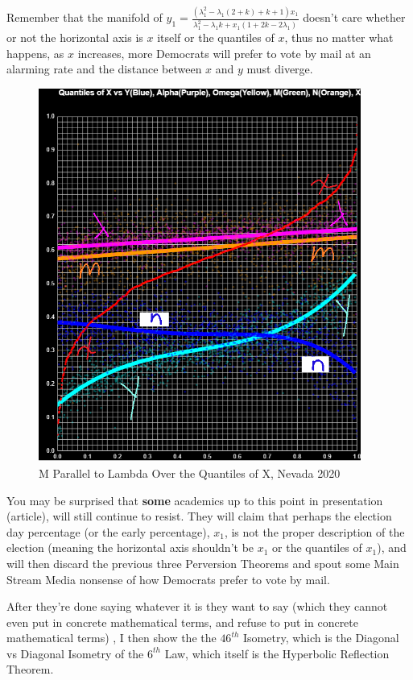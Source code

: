 \documentclass[preprint,13pt]{elsarticle}
\begin{document}
Remember that the manifold of $y_{1}=\frac{(\lambda_{1}^2-\lambda_{1}(2+k)+k+1)x_{1}}{\lambda_{1}^2-\lambda_{1}k+x_{1}(1+2k-2\lambda_{1})}$ doesn't care whether or not the horizontal axis is $x$ itself or the quantiles of $x$, thus no matter what happens, as $x$ increases, more Democrats will prefer to vote by mail at an alarming rate and the distance between $x$ and $y$ must diverge.
\begin{figure}[bp!]
\begin{center}
\caption{M Parallel to Lambda Over the Quantiles of X, Nevada 2020}
\includegraphics[width=300pt]{M Lambda Parallel.png}
\end{center}
\end{figure}
\newpage
You may be surprised that \textbf{some} academics up to this point in presentation (article), will still continue to resist. They will claim that perhaps the election day percentage (or the early percentage), $x_{1}$, is not the proper description of the election (meaning the horizontal axis shouldn't be $x_{1}$ or the quantiles of $x_{1}$), and will then discard the previous three Perversion Theorems and spout some Main Stream Media nonsense of how Democrats prefer to vote by mail.

After they're done saying whatever it is they want to say (which they cannot even put in concrete mathematical terms, and refuse to put in concrete mathematical terms) , I then show the the $46^{th}$ Isometry, which is the Diagonal vs Diagonal Isometry of the $6^{th}$ Law, which itself is the Hyperbolic Reflection Theorem.
\end{document}
